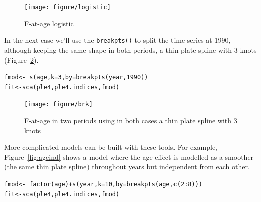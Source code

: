 \documentclass[a4paper,english,10pt]{article}\usepackage[]{graphicx}\usepackage[]{color}
\makeatletter
\newcommand{\hlnum}[1]{\textcolor[rgb]{0.2,0.2,0.2}{#1}}%
\newcommand{\hlopt}[1]{\textcolor[rgb]{0.2,0.2,0.2}{#1}}%
\newcommand{\hlstd}[1]{\textcolor[rgb]{0,0,0}{#1}}%
\newcommand{\hlkwb}[1]{\textcolor[rgb]{0.361,0.506,0.596}{#1}}%
\newcommand{\hlkwc}[1]{\textcolor[rgb]{0.361,0.506,0.596}{#1}}%
\newcommand{\hlkwd}[1]{\textcolor[rgb]{0.361,0.506,0.596}{#1}}%
\newenvironment{kframe}{%
 \def\at@end@of@kframe{}%
 \ifinner\ifhmode%
  \def\at@end@of@kframe{\end{minipage}}%
  \begin{minipage}{\columnwidth}%
 \fi\fi%
 \def\FrameCommand##1{\hskip\@totalleftmargin \hskip-\fboxsep
 \colorbox{shadecolor}{##1}\hskip-\fboxsep
     \hskip-\linewidth \hskip-\@totalleftmargin \hskip\columnwidth}%
 \MakeFramed {\advance\hsize-\width
   \@totalleftmargin\z@ \linewidth\hsize
   \@setminipage}}%
 {\par\unskip\endMakeFramed%
 \at@end@of@kframe}
\newenvironment{knitrout}{}{} %
\newcommand{\code}[1]{{\texttt{#1}}}
\makeatother
\begin{document}
\begin{knitrout}
\color{fgcolor}\begin{figure}[H]


{\centering \texttt{[image: figure/logistic]} 

}

\caption[F-at-age logistic]{F-at-age logistic\label{fig:logistic}}
\end{figure}


\end{knitrout}

In the next case we'll use the \code{breakpts()} to split the time series at 1990, although keeping the same shape in both periods, a thin plate spline with 3 knots (Figure~\ref{fig:brk}).

\begin{knitrout}
\color{fgcolor}\begin{kframe}
\begin{alltt}
\hlstd{fmod} \hlkwb{<-} \hlopt{~}\hlkwd{s}\hlstd{(age,} \hlkwc{k} \hlstd{=} \hlnum{3}\hlstd{,} \hlkwc{by} \hlstd{=} \hlkwd{breakpts}\hlstd{(year,} \hlnum{1990}\hlstd{))}
\hlstd{fit} \hlkwb{<-} \hlkwd{sca}\hlstd{(ple4, ple4.indices, fmod)}
\end{alltt}
\end{kframe}
\end{knitrout}

\begin{knitrout}
\color{fgcolor}\begin{figure}[H]


{\centering \texttt{[image: figure/brk]} 

}

\caption[F-at-age in two periods using in both cases a thin plate spline with 3 knots]{F-at-age in two periods using in both cases a thin plate spline with 3 knots\label{fig:brk}}
\end{figure}


\end{knitrout}

More complicated models can be built with these tools. For example, Figure~\ref{fig:ageind} shows a model where the age effect is modelled as a smoother (the same thin plate spline) throughout years but independent from each other.

\begin{knitrout}
\color{fgcolor}\begin{kframe}
\begin{alltt}
\hlstd{fmod} \hlkwb{<-} \hlopt{~} \hlkwd{factor}\hlstd{(age)} \hlopt{+} \hlkwd{s}\hlstd{(year,} \hlkwc{k}\hlstd{=}\hlnum{10}\hlstd{,} \hlkwc{by} \hlstd{=} \hlkwd{breakpts}\hlstd{(age,} \hlkwd{c}\hlstd{(}\hlnum{2}\hlopt{:}\hlnum{8}\hlstd{)))}
\hlstd{fit} \hlkwb{<-} \hlkwd{sca}\hlstd{(ple4, ple4.indices, fmod)}
\end{alltt}
\end{kframe}
\end{knitrout}
\end{document}
